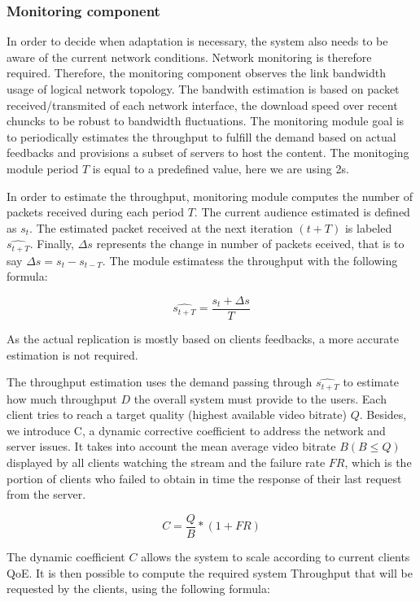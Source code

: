 \subsubsection*{Monitoring component}
In order to decide when adaptation is necessary, the system also needs to be aware of the current network conditions. Network monitoring is therefore required.
Therefore, the monitoring component observes the link bandwidth usage of logical network topology. The bandwith estimation is based on packet received/transmited of each network interface, the download speed over recent chuncks to be robust to bandwidth fluctuations. The monitoring module goal is to periodically estimates the throughput to fulfill the demand based on actual feedbacks and provisions a subset of servers to host the content. The monitoging module period $T$ is equal to a predefined value, here we are using 2s.

In order to estimate the throughput, monitoring module computes the number of packets received during each period $T$. The current audience estimated is defined as $s_{t}$. The estimated packet received at the next iteration $(t+T)$ is labeled $\widehat{s_{t+T}}$. Finally, $\Delta s$ represents the change in number of packets eceived, that is to say $\Delta s = s_{t} - s_{t-T}$. The module estimatess the throughput with the following formula:

$$
\widehat{s_{t+T}} = \frac{s_{t} + \Delta s}{T}
$$

As the actual replication is mostly based on clients feedbacks, a more accurate estimation is not required.

The throughput estimation uses the demand passing through $\widehat{s_{t+T}}$ to estimate how much throughput $D$ the overall system must provide to the users. Each client tries to reach a target quality (highest available video bitrate) $Q$. 
Besides, we introduce C, a dynamic corrective coefficient to address the network and server issues. It takes into account the mean average video bitrate $B (B \leqslant Q)$ displayed by all clients watching the stream and the failure rate $FR$, which is the portion of clients who failed to obtain in time the response of their last request from the server.

$$
C = \frac{Q}{B} * (1 + FR)
$$

The dynamic coefficient $C$ allows the system to scale according to current clients QoE. It is then possible to compute the required system Throughput that will be requested by the clients, using the following formula:

